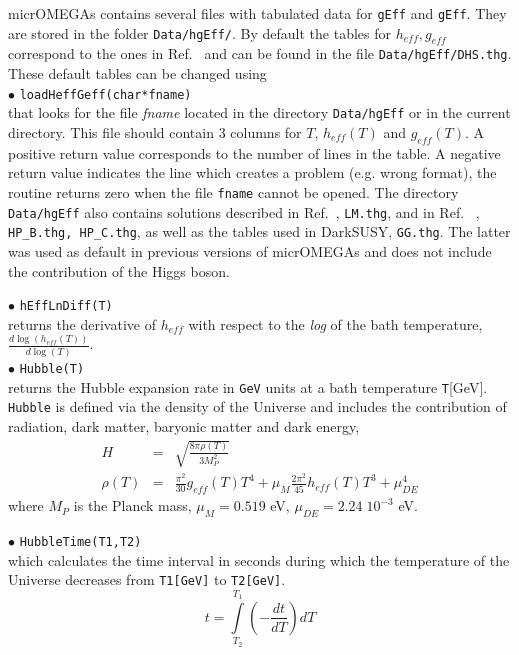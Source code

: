 \documentclass[12pt,a4paper]{article}
\begin{document}
micrOMEGAs contains several files with tabulated data for {\tt gEff} and {\tt gEff}. They are stored  in the folder {\tt Data/hgEff/}.  
By default the tables for  $h_{eff}, g_{eff}$ correspond to the ones in Ref.~\cite{Drees:2015exa} and can be found in the file \verb|Data/hgEff/DHS.thg|.
These default tables can be changed using  \\
%
\noindent$\bullet$ \verb|loadHeffGeff(char*fname)|\\
that  looks for  the file {\it fname}   located in the directory {\tt Data/hgEff} or in the current directory. This file should 
 contain  3 columns for $T$, $h_{eff}(T)$ and $g_{eff}(T)$. 
A positive  return value corresponds to the number of lines in the table. A negative return value indicates the line which creates a problem (e.g. wrong format), the routine returns zero when the file \verb|fname| cannot be opened.
The  directory  {\tt Data/hgEff}  also contains solutions described in Ref.~\cite{Laine:2015kra}, {\tt LM.thg},  and in Ref.~ \cite{Hindmarsh:2005ix},  {\tt HP\_B.thg, HP\_C.thg},  as well as the tables used in DarkSUSY, {\tt GG.thg}. The latter  was  used as default in  previous versions of
micrOMEGAs and does not include the contribution of the Higgs boson.


\noindent$\bullet$ \verb|hEffLnDiff(T)|\\ returns the derivative of $h_{eff}$ with respect to the
 {\it log} of the bath temperature, $\frac{d\log(h_{eff}(T))}{d\log(T)}$.\\
\noindent$\bullet$ \verb|Hubble(T)|\\ returns the Hubble expansion rate in
{\tt GeV} units   at a bath temperature \verb|T|[GeV].
{\tt Hubble} is defined via  the density of the  Universe  and includes the contribution of radiation,
dark matter, baryonic matter and dark energy,
\begin{eqnarray}
\label{Hubble}
   H&=& \sqrt{\frac{8\pi \rho(T)}{ 3 M_P^2}}    \\
   \rho(T)&=&  \frac{\pi^2}{30} g_{eff}(T) T^4 + \mu_{M}\frac{2\pi^2}{45} h_{eff}(T) T^3 + \mu_{DE}^4 
   \label{eq:H}
\end{eqnarray}
where $M_P$   is the Planck mass,  $\mu_{M}=0.519$ eV,   $\mu_{DE}=2.24\;10^{-3}$ eV.

\noindent$\bullet$ \verb|HubbleTime(T1,T2) |\\
which calculates  the time interval in  seconds  during which the  temperature of the Universe
decreases from {\tt T1[GeV]}  to {\tt T2[GeV]}.  
\begin{equation}
  t= \int \limits_{T_2}^{T_1} \left( -\frac{dt}{dT} \right) dT 
\end{equation}
\end{document}

